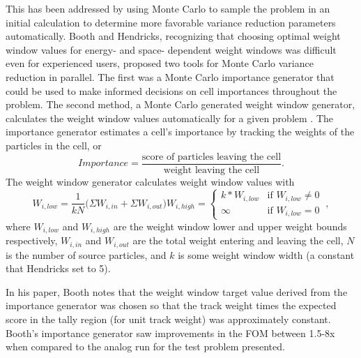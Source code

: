 This has been addressed by using Monte Carlo to sample the problem in an initial
calculation to determine more favorable variance reduction parameters automatically.
Booth and Hendricks,
recognizing that choosing optimal weight window values for energy- and space-
dependent weight windows was difficult even for experienced users, proposed two
tools for Monte Carlo variance reduction in parallel. The first was a
Monte Carlo importance generator \cite{booth_automatic_1982} that could be used
to make informed decisions on cell importances throughout the problem. The
second method, a Monte Carlo generated weight window generator,
calculates the weight window values automatically for a given problem
\cite{hendricks_code-generated_1982}.
The importance generator estimates a cell's importance
by tracking the weights of the particles in the cell, or
\begin{equation}
  Importance  = \frac{\text{score of particles leaving the cell}}
                     {\text{weight leaving the cell}}.
\label{eq:BoothImp}
\end{equation}
The weight window generator calculates weight window values with
\begin{subequations}
\begin{equation}
  W_{i,low} = \frac{1}{kN}\big(\Sigma W_{i,in} + \Sigma W_{i,out} \big)
\end{equation}
\begin{equation}
  W_{i,high} =
  \begin{cases}
    k*W_{i,low} & \text{if } W_{i,low} \neq 0 \\
    \infty & \text{if } W_{i,low} = 0
  \end{cases}  \:,
  \label{eq:hendricksWW}
\end{equation}
\end{subequations}
where $W_{i,low}$ and $W_{i,high}$ are the weight window lower and upper weight
bounds respectively, $W_{i,in}$ and $W_{i,out}$ are the total weight entering
and leaving the cell, $N$ is the number of source particles, and $k$ is some weight
window width (a constant that Hendricks set to 5).

In his
paper, Booth notes that the weight window target value derived from the
importance generator was chosen so that the
track weight times the expected score in the tally region (for unit track
weight) was approximately constant. Booth's importance generator saw
improvements in the FOM between 1.5-8x when compared to the analog run for the
test problem presented.


